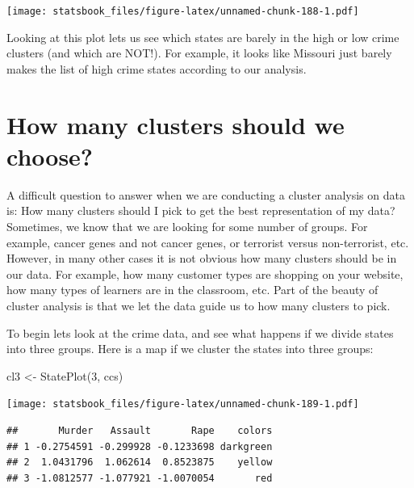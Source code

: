 \documentclass[
]{book}
\newenvironment{Shaded}{\begin{snugshade}}{\end{snugshade}}
\newcommand{\AttributeTok}[1]{\textcolor[rgb]{0.77,0.63,0.00}{#1}}
\newcommand{\ConstantTok}[1]{\textcolor[rgb]{0.00,0.00,0.00}{#1}}
\newcommand{\DecValTok}[1]{\textcolor[rgb]{0.00,0.00,0.81}{#1}}
\newcommand{\FunctionTok}[1]{\textcolor[rgb]{0.00,0.00,0.00}{#1}}
\newcommand{\NormalTok}[1]{#1}
\newcommand{\OtherTok}[1]{\textcolor[rgb]{0.56,0.35,0.01}{#1}}
\newcommand{\SpecialCharTok}[1]{\textcolor[rgb]{0.00,0.00,0.00}{#1}}
\theoremstyle{definition}
\theoremstyle{definition}
\theoremstyle{definition}
\theoremstyle{definition}
\theoremstyle{remark}
\begin{document}
\begin{Shaded}
\end{Shaded}

\texttt{[image: statsbook\_files/figure-latex/unnamed-chunk-188-1.pdf]}

Looking at this plot lets us see which states are barely in the high or low crime clusters (and which are NOT!). For example, it looks like Missouri just barely makes the list of high crime states according to our analysis.

\hypertarget{how-many-clusters-should-we-choose}{%
\section{How many clusters should we choose?}\label{how-many-clusters-should-we-choose}}

A difficult question to answer when we are conducting a cluster analysis on data is: How many clusters should I pick to get the best representation of my data? Sometimes, we know that we are looking for some number of groups. For example, cancer genes and not cancer genes, or terrorist versus non-terrorist, etc. However, in many other cases it is not obvious how many clusters should be in our data. For example, how many customer types are shopping on your website, how many types of learners are in the classroom, etc. Part of the beauty of cluster analysis is that we let the data guide us to how many clusters to pick.

To begin lets look at the crime data, and see what happens if we divide states into three groups. Here is a map if we cluster the states into three groups:

\begin{Shaded}
\begin{Highlighting}[]
\NormalTok{cl3 }\OtherTok{\textless{}{-}} \FunctionTok{StatePlot}\NormalTok{(}\DecValTok{3}\NormalTok{, ccs)}
\end{Highlighting}
\end{Shaded}

\texttt{[image: statsbook\_files/figure-latex/unnamed-chunk-189-1.pdf]}

\begin{verbatim}
##       Murder   Assault       Rape    colors
## 1 -0.2754591 -0.299928 -0.1233698 darkgreen
## 2  1.0431796  1.062614  0.8523875    yellow
## 3 -1.0812577 -1.077921 -1.0070054       red
\end{verbatim}
\end{document}
